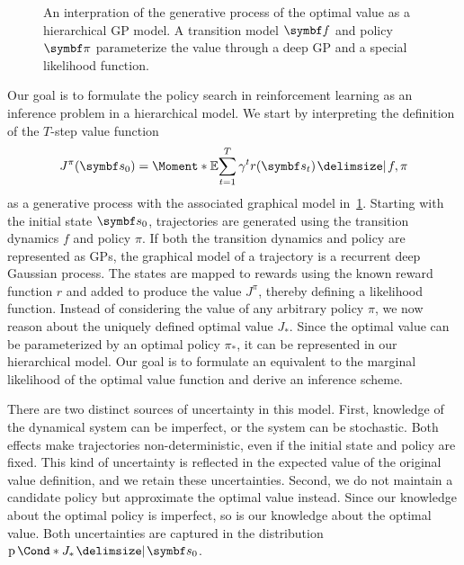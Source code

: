 \begin{figure}[t]
    \centering
    
    \caption[Graphical model: Policy search as a hierarchical GP]{
        \label{fig:mountaincar:graphical_model}
        An interpration of the generative process of the optimal value as a hierarchical GP model.
        A transition model $\mat{f}$ and policy $\mat{\pi}$ parameterize the value through a deep GP and a special likelihood function.
    }
\end{figure}
Our goal is to formulate the policy search in reinforcement learning as an inference problem in a hierarchical model.
We start by interpreting the definition of the $T$-step value function
\begin{align}
    J^\pi(\mat{s}_0) = \Moment*{\E}{\sum_{t=1}^T \gamma^t r(\mat{s}_t) \given f, \pi}
\end{align}
as a generative process with the associated graphical model in~\cref{fig:mountaincar:graphical_model}.
Starting with the initial state $\mat{s}_0$, trajectories are generated using the transition dynamics $f$ and policy $\pi$.
If both the transition dynamics and policy are represented as GPs, the graphical model of a trajectory is a recurrent deep Gaussian process.
The states are mapped to rewards using the known reward function $r$ and added to produce the value $J^\pi$, thereby defining a likelihood function.
Instead of considering the value of any arbitrary policy $\pi$, we now reason about the uniquely defined optimal value $J_\ast$.
Since the optimal value can be parameterized by an optimal policy $\pi_\ast$, it can be represented in our hierarchical model.
Our goal is to formulate an equivalent to the marginal likelihood of the optimal value function and derive an inference scheme.

There are two distinct sources of uncertainty in this model.
First, knowledge of the dynamical system can be imperfect, or the system can be stochastic.
Both effects make trajectories non-deterministic, even if the initial state and policy are fixed.
This kind of uncertainty is reflected in the expected value of the original value definition, and we retain these uncertainties.
Second, we do not maintain a candidate policy but approximate the optimal value instead.
Since our knowledge about the optimal policy is imperfect, so is our knowledge about the optimal value.
Both uncertainties are captured in the distribution $\Prob*{J_\ast \given \mat{s}_0}$.

